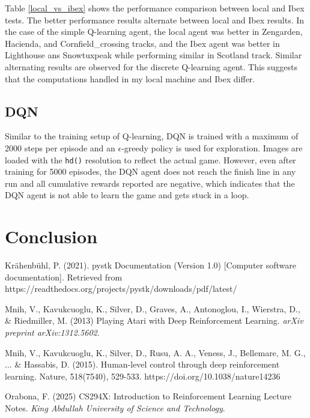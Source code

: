 \documentclass{article}
\begin{document}
Table \ref{local_vs_ibex} shows the performance comparison between local and Ibex tests. The better performance results alternate between local and Ibex results. In the case of the simple Q-learning agent, the local agent was better in Zengarden, Hacienda, and Cornfield\_crossing tracks, and the Ibex agent was better in Lighthouse ans Snowtuxpeak while performing similar in Scotland track. Similar alternating results are observed for the discrete Q-learning agent. This suggests that the computations handled in my local machine and Ibex differ. 

\subsection{DQN}
Similar to the training setup of Q-learning, DQN is trained with a maximum of 2000 steps per episode and an $\epsilon$-greedy policy is used for exploration. Images are loaded with the \texttt{hd()} resolution to reflect the actual game. However, even after training for 5000 episodes, the DQN agent does not reach the finish line in any run and all cumulative rewards reported are negative, which indicates that the DQN agent is not able to learn the game and gets stuck in a loop.


\section{Conclusion}



\begin{thebibliography}{2}

Krähenbühl, P. (2021). pystk Documentation (Version 1.0) [Computer software documentation]. Retrieved from https://readthedocs.org/projects/pystk/downloads/pdf/latest/

Mnih, V., Kavukcuoglu, K., Silver, D., Graves, A., Antonoglou, I., Wierstra, D., \& Riedmiller, M. (2013) Playing Atari with Deep Reinforcement Learning. {\it arXiv preprint arXiv:1312.5602}.

Mnih, V., Kavukcuoglu, K., Silver, D., Rusu, A. A., Veness, J., Bellemare, M. G., ... \& Hassabis, D. (2015). Human-level control through deep reinforcement learning. Nature, 518(7540), 529-533. https://doi.org/10.1038/nature14236

Orabona, F. (2025) CS294X: Introduction to Reinforcement Learning Lecture Notes. {\it King Abdullah University of Science and Technology}.

\end{thebibliography}
\end{document}
